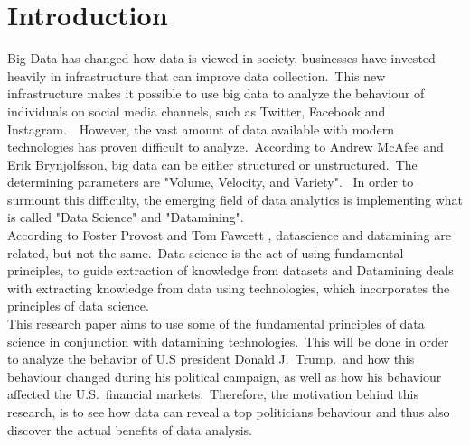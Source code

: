\documentclass[12pt]{article}
\begin{document}
\cleardoublepage %



















\color{NavyBlue} \section{Introduction} \label{sec:intro}

\color {black}

Big Data has changed how data is viewed in society, businesses have invested heavily in infrastructure that can improve data collection.\ This new infrastructure makes it possible to use big data to analyze the behaviour of individuals on social media channels, such as Twitter, Facebook and Instagram.\ \citep{foster}\ However, the vast amount of data available with modern technologies has proven difficult to analyze.\ According to Andrew McAfee and Erik Brynjolfsson, big data can be either structured or unstructured.\ The determining parameters are "Volume, Velocity, and Variety". \citep{velocity}\ In order to surmount  this difficulty,  the emerging field of data analytics is implementing what is called "Data Science" and "Datamining".\ \\

According to Foster Provost and Tom Fawcett , datascience and datamining are related, but not the same.\  Data science is the act of using fundamental principles, to guide extraction of knowledge from datasets and  Datamining deals with extracting knowledge from data using technologies, which incorporates the principles of data science.\ \citep{foster} \\

This research paper aims to use some of the fundamental principles of data science in conjunction with datamining technologies.\ This will be done in order to analyze the behavior of U.S president Donald J.\ Trump.\ and how this behaviour changed during his political campaign, as well as how his behaviour affected the U.S.\ financial markets.\ Therefore, the motivation behind this research, is to see how data can reveal a top politicians behaviour and thus also discover the actual benefits of data analysis. 
\end{document}
